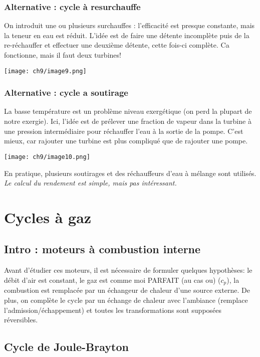 		\subsubsection{Alternative : cycle à resurchauffe}
		On introduit une ou plusieurs surchauffes : l'efficacité est presque 
		constante, mais la teneur en eau est réduit. L'idée est de faire une 
		détente incomplète puis de la re-réchauffer et effectuer une deuxième 
		détente, cette fois-ci complète. Ca fonctionne, mais il faut deux 
		turbines!
		\begin{center}
				\texttt{[image: ch9/image9.png]}
		\end{center}
	
		\subsubsection{Alternative : cycle a soutirage}
		La basse température est un problème niveau exergétique (on perd la plupart 
		de notre exergie). Ici, l'idée est de prélever une fraction de vapeur 
		dans la turbine à une pression intermédiaire pour réchauffer l'eau à la sortie 
		de la pompe. C'est mieux, car rajouter une turbine est plus compliqué 
		que de rajouter une pompe.
				\begin{center}
				\texttt{[image: ch9/image10.png]}
		\end{center}
		En pratique, plusieurs soutirages et des réchauffeurs d’eau à mélange
		sont utilisés. \textit{Le calcul du rendement est simple, mais pas intéressant.}
		
		
\newpage
\section{Cycles à gaz}
	\subsection{Intro : moteurs à combustion interne}
	Avant d'étudier ces moteurs, il est nécessaire de formuler quelques hypothèses: le 
	débit d'air est constant, le gaz est comme moi PARFAIT (au cas ou) ($c_p$), la combustion est remplacée 
	par un échangeur de chaleur d'une source externe. De plus, on complète le cycle par 
	un échange de chaleur avec l'ambiance (remplace l'admission/échappement) et toutes 
	les transformations sont supposées réversibles.
	
	\subsection{Cycle de Joule-Brayton}
